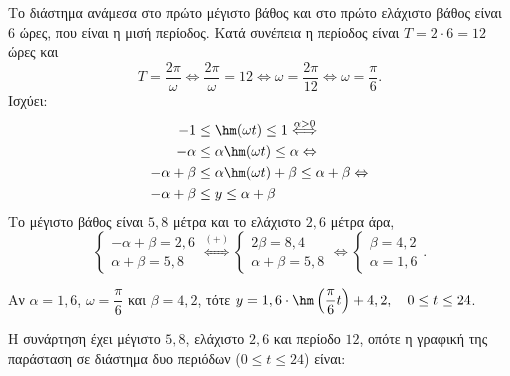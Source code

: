 \documentclass[11pt,a4paper,twoside]{book}
\begin{document}
\begin{alist}
\item Το διάστημα ανάμεσα στο πρώτο μέγιστο βάθος και στο πρώτο ελάχιστο βάθος είναι $6$ ώρες, που είναι η μισή περίοδος. Κατά συνέπεια η περίοδος είναι $T = 2 \cdot 6 = 12$ ώρες και
\[T = \frac{2\pi}{\omega} \Leftrightarrow \frac{2\pi}{\omega} = 12 \Leftrightarrow \omega = \frac{2\pi}{12} \Leftrightarrow \omega = \frac{\pi}{6}.\]
Ισχύει:
\begin{align*}
-1 &\le \hm (\omega t) \le 1 \overset{\alpha > 0}{\Longleftrightarrow} \\
-\alpha &\le \alpha\hm (\omega t) \le \alpha \Leftrightarrow \\
-\alpha + \beta &\le \alpha\hm (\omega t) + \beta \le \alpha + \beta \Leftrightarrow \\
-\alpha + \beta &\le y \le \alpha + \beta
\end{align*}
Το μέγιστο βάθος είναι $5,8$ μέτρα και το ελάχιστο $2,6$ μέτρα άρα,
\[\begin{cases} -\alpha + \beta = 2,6 \\ \alpha + \beta = 5,8 \end{cases} \overset{(+)}{\Longleftrightarrow} \begin{cases} 2\beta = 8,4 \\ \alpha + \beta = 5,8 \end{cases} \Leftrightarrow \begin{cases} \beta = 4,2 \\ \alpha = 1,6 \end{cases}.\]
\item Αν $\alpha = 1,6$, $\omega = \dfrac{\pi}{6}$ και $\beta = 4,2$, τότε $y = 1,6 \cdot \hm \left(\dfrac{\pi}{6}t\right) + 4,2, \quad 0 \le t \le 24$.
\begin{rlist}
\item Η συνάρτηση έχει μέγιστο $5,8$, ελάχιστο $2,6$ και περίοδο $12$, οπότε η γραφική της παράσταση σε διάστημα δυο περιόδων ($0 \le t \le 24$) είναι:
\begin{center}
\end{center}
\end{rlist}
\end{alist}
\end{document}
